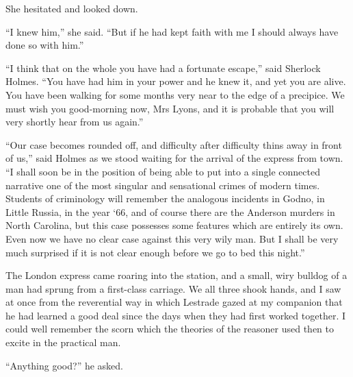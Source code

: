 \documentclass[paper=5.5in:8.5in,BCOR=7mm,twoside,DIV=calc,12pt,usegeometry,openany,chapterprefix,endperiod,headings=big]{scrbook} %
\begin{document}
She hesitated and looked down.

\enquote{I knew him,} she said. \enquote{But if he had kept faith with me I should always have done so with him.}

\enquote{I think that on the whole you have had a fortunate escape,} said Sherlock Holmes. \enquote{You have had him in your power and he knew it, and yet you are alive. You have been walking for some months very near to the edge of a precipice. We must wish you good-morning now, Mrs Lyons, and it is probable that you will very shortly hear from us again.}

\enquote{Our case becomes rounded off, and difficulty after difficulty thins away in front of us,} said Holmes as we stood waiting for the arrival of the express from town. \enquote{I shall soon be in the position of being able to put into a single connected narrative one of the most singular and sensational crimes of modern times. Students of criminology will remember the analogous incidents in Godno, in Little Russia, in the year `66, and of course there are the Anderson murders in North Carolina, but this case possesses some features which are entirely its own. Even now we have no clear case against this very wily man. But I shall be very much surprised if it is not clear enough before we go to bed this night.}

The London express came roaring into the station, and a small, wiry bulldog of a man had sprung from a first-class carriage. We all three shook hands, and I saw at once from the reverential way in which Lestrade gazed at my companion that he had learned a good deal since the days when they had first worked together. I could well remember the scorn which the theories of the reasoner used then to excite in the practical man.


\enquote{Anything good?} he asked.
\end{document}
